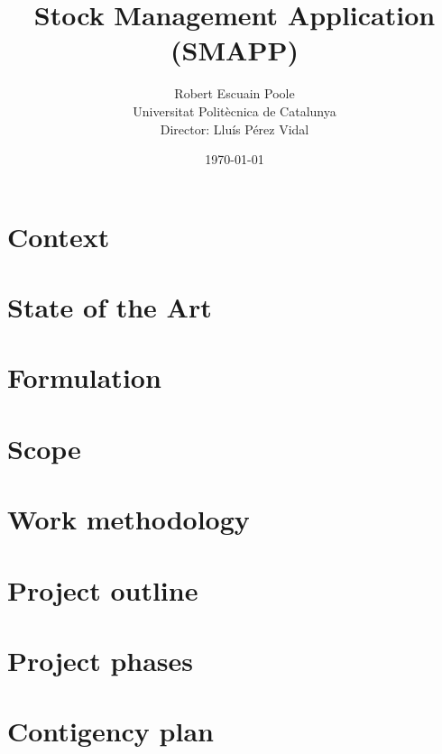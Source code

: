 \documentclass{report}
\begin{document}
    \title{Stock Management Application (SMAPP)}
    \author{Robert Escuain Poole\\Universitat Politècnica de Catalunya\\Director: Lluís Pérez Vidal}
    \date{\today}
    \maketitle

    \tableofcontents

    \chapter{Context}
    
    
    \chapter{State of the Art}
    
    
    \chapter{Formulation}
    
    
    \chapter{Scope}
    
    
    \chapter{Work methodology}
    
    
    \chapter{Project outline}
    
    
    \chapter{Project phases}
    
    
    \chapter{Contigency plan}
    
    
\end{document}
